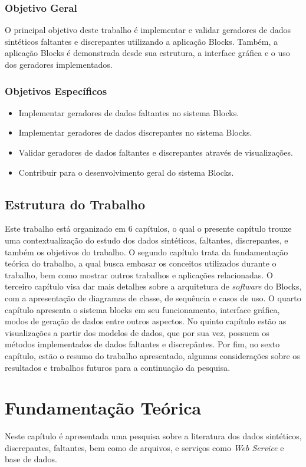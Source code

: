 \documentclass[
	12pt,				%
	openright,			%
	oneside,			%
	a4paper,			%
	english,			%
	brazil				%
	]{abntex2}
\begin{document}
		\subsection{Objetivo Geral}
			O principal objetivo deste trabalho é implementar e validar geradores de dados sintéticos faltantes e discrepantes utilizando a aplicação Blocks.
			Também, a aplicação Blocks é demonstrada desde sua estrutura, a interface gráfica e o uso dos geradores implementados.			
		\subsection{Objetivos Específicos}
		\begin{itemize}
			\item Implementar geradores de dados faltantes no sistema Blocks.
			\item Implementar geradores de dados discrepantes no sistema Blocks.
			\item Validar geradores de dados faltantes e discrepantes através de visualizações.
			\item Contribuir para o desenvolvimento geral do sistema Blocks.
		\end{itemize}
	\section{Estrutura do Trabalho}
		Este trabalho está organizado em 6 capítulos, o qual o presente capítulo trouxe uma contextualização do estudo dos dados sintéticos, faltantes, discrepantes, e também os objetivos do trabalho.
		O segundo capítulo trata da fundamentação teórica do trabalho, a qual busca embasar os conceitos utilizados durante o trabalho, bem como mostrar outros trabalhos e aplicações relacionadas.
		O terceiro capítulo visa dar mais detalhes sobre a arquitetura de \emph{software} do Blocks, com a apresentação de diagramas de classe, de sequência e casos de uso.
		O quarto capítulo apresenta o sistema blocks em seu funcionamento, interface gráfica, modos de geração de dados entre outros aspectos.
		No quinto capítulo estão as visualizações a partir dos modelos de dados, que por sua vez, possuem os métodos implementados de dados faltantes e discrepântes.
		Por fim, no sexto capítulo, estão o resumo do trabalho apresentado, algumas considerações sobre os resultados e trabalhos futuros para a continuação da pesquisa. 

\chapter{Fundamentação Teórica}
	Neste capítulo é apresentada uma pesquisa sobre a literatura dos dados sintéticos, discrepantes, faltantes,
	 bem como de arquivos, e serviços como \emph{Web Service} e base de dados.
\end{document}
